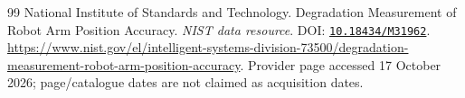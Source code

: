 \begin{thebibliography}{99}
 National Institute of Standards and Technology. Degradation Measurement of Robot Arm Position Accuracy. \emph{NIST data resource}. DOI: \href{https://doi.org/10.18434/M31962}{\nolinkurl{10.18434/M31962}}. \url{https://www.nist.gov/el/intelligent-systems-division-73500/degradation-measurement-robot-arm-position-accuracy}. Provider page accessed 17 October 2026; page/catalogue dates are not claimed as acquisition dates.

\end{thebibliography}
